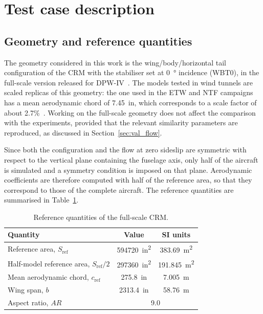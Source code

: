 
\section{Test case description}
\label{sec:val_testcase}

\subsection{Geometry and reference quantities}
\label{sec:val_geometry}

The geometry considered in this work is the wing/body/horizontal tail configuration of the CRM with the stabiliser set at \SI{0}{\degree} incidence (WBT0), in the full-scale version released for DPW-IV~\cite{vassberg2008}. The models tested in wind tunnels are scaled replicas of this geometry: the one used in the ETW and NTF campaigns has a mean aerodynamic chord of \SI{7.45}{in}, which corresponds to a scale factor of about 2.7\%~\cite{rivers2015}. Working on the full-scale geometry does not affect the comparison with the experiments, provided that the relevant similarity parameters are reproduced, as discussed in Section~\ref{sec:val_flow}.

Since both the configuration and the flow at zero sideslip are symmetric with respect to the vertical plane containing the fuselage axis, only half of the aircraft is simulated and a symmetry condition is imposed on that plane. Aerodynamic coefficients are therefore computed with half of the reference area, so that they correspond to those of the complete aircraft. The reference quantities are summarised in Table~\ref{tab:val_refquantities}.

\begin{table}[htbp]
  \centering
  \caption{Reference quantities of the full-scale CRM.}
  \label{tab:val_refquantities}
  \begin{tabular}{lcc}
    \hline
    Quantity & Value & SI units \\
    \hline
    Reference area, $S_\mathrm{ref}$ & \SI{594720}{in^2} & \SI{383.69}{m^2} \\
    Half-model reference area, $S_\mathrm{ref}/2$ & \SI{297360}{in^2} & \SI{191.845}{m^2} \\
    Mean aerodynamic chord, $c_\mathrm{ref}$ & \SI{275.8}{in} & \SI{7.005}{m} \\
    Wing span, $b$ & \SI{2313.4}{in} & \SI{58.76}{m} \\
    Aspect ratio, $AR$ & \multicolumn{2}{c}{9.0} \\
    \hline
  \end{tabular}
\end{table}

